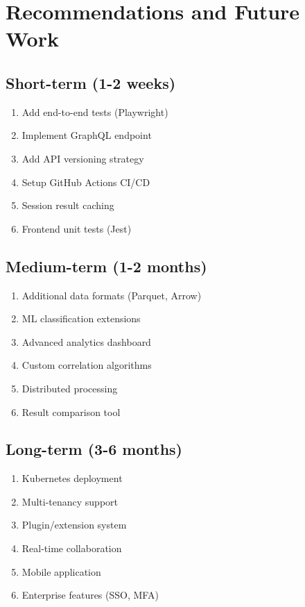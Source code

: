 \documentclass[12pt,a4paper]{report}
\begin{document}
\chapter{Recommendations and Future Work}

\section{Short-term (1-2 weeks)}

\begin{enumerate}
    \item Add end-to-end tests (Playwright)
    \item Implement GraphQL endpoint
    \item Add API versioning strategy
    \item Setup GitHub Actions CI/CD
    \item Session result caching
    \item Frontend unit tests (Jest)
\end{enumerate}

\section{Medium-term (1-2 months)}

\begin{enumerate}
    \item Additional data formats (Parquet, Arrow)
    \item ML classification extensions
    \item Advanced analytics dashboard
    \item Custom correlation algorithms
    \item Distributed processing
    \item Result comparison tool
\end{enumerate}

\section{Long-term (3-6 months)}

\begin{enumerate}
    \item Kubernetes deployment
    \item Multi-tenancy support
    \item Plugin/extension system
    \item Real-time collaboration
    \item Mobile application
    \item Enterprise features (SSO, MFA)
\end{enumerate}
\end{document}
